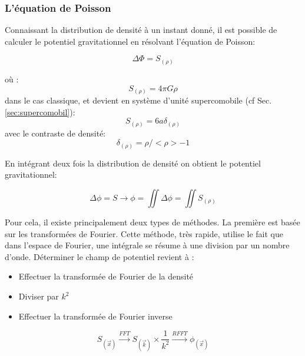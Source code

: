 \subsubsection{L'équation de Poisson}

Connaissant la distribution de densité à un instant donné, il est possible de calculer le potentiel gravitationnel en résolvant l'équation de Poisson:

\begin{equation}
\Delta \Phi = S_{(\rho)}
\end{equation}

où :
\begin{equation}
S_{(\rho)} = 4 \pi G \rho
\end{equation}
dans le cas classique, et devient en système d'unité supercomobile (cf Sec. \ref{sec:supercomobil}):
\begin{equation}
S_{(\rho)} = 6 a \delta_{(\rho)}
\end{equation}
avec le contraste de densité: 
\begin{equation}
\delta_{(\rho)} = \rho / < \rho > - 1 
\end{equation}

En intégrant deux fois la distribution de densité on obtient le potentiel gravitationnel:

\begin{equation}
\Delta \phi = S \longrightarrow \phi = \iint \Delta \phi = \iint S_{(\rho)}
\end{equation}

Pour cela, il existe principalement deux types de méthodes. 
La première est basée sur les transformées de Fourier. 
Cette méthode, très rapide, utilise le fait que dans l'espace de Fourier, une intégrale se résume à une division par un nombre d'onde. 
Déterminer le champ de potentiel revient à : 
\begin{itemize}
\item Effectuer la transformée de Fourier de la densité
\item Diviser par $k^2$
\item Effectuer la transformée de Fourier inverse
\end{itemize}

\begin{equation}
S_{(\vec{x})} \overset{FFT}{\longrightarrow}  S_{(\vec{k})} \times \frac{1}{k^2}  \overset{RFFT}{\longrightarrow}  \phi_{(\vec{x})}
\end{equation}

